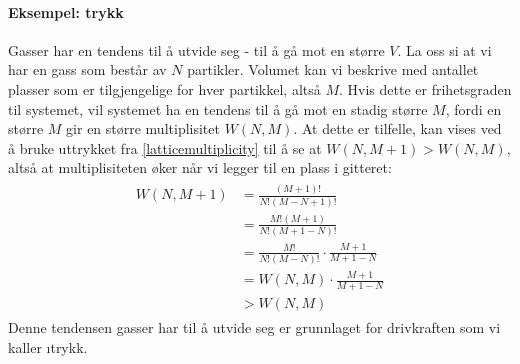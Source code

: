 \paragraph{Eksempel: trykk} Gasser har en tendens til å utvide seg - til å gå mot en større $V$. La oss si at vi har en gass som består av $N$ partikler. Volumet kan vi beskrive med antallet plasser som er tilgjengelige for hver partikkel, altså $M$. Hvis dette er frihetsgraden til systemet, vil systemet ha en tendens til å gå mot en stadig større $M$, fordi en større $M$ gir en større multiplisitet $W(N,M)$. At dette er tilfelle, kan vises ved å bruke uttrykket fra \eqref{latticemultiplicity} til å se at $W(N,M+1) > W(N,M)$, altså at multiplisiteten øker når vi legger til en plass i gitteret:
\begin{align}
\begin{split}
	W(N,M+1)&=\frac{(M+1)!}{N!(M-N+1)!} \\
	&= \frac{M!(M+1)}{N!(M+1-N)!} \\
	&= \frac{M!}{N!(M-N)!}\cdot\frac{M+1}{M+1-N} \\
	&= W(N,M)\cdot\frac{M+1}{M+1-N} \\
	&> W(N,M)
\end{split}
\end{align}
Denne tendensen gasser har til å utvide seg er grunnlaget for drivkraften som vi kaller \i{trykk}. 

